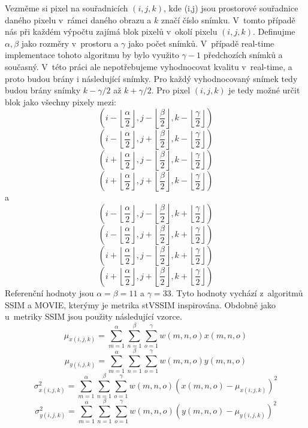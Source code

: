 \documentclass[thesis=M,czech]{FITthesis}[2016/06/26]
\begin{document}
Vezměme si pixel na souřadnicích $(i,j,k)$, kde (i,j) jsou prostorové souřadnice daného pixelu v~rámci daného obrazu a $k$ značí číslo snímku. V~tomto případě nás při každém výpočtu zajímá blok pixelů v~okolí pixelu $(i,j,k)$. Definujme $\alpha, \beta$ jako rozměry v~prostoru a $\gamma$ jako počet snímků. V~případě real-time implementace tohoto algoritmu by bylo využito $\gamma -1$ předchozích snímků a současný. V~této práci ale nepotřebujeme vyhodnocovat kvalitu v~real-time, a proto budou brány i následující snímky. Pro každý vyhodnocovaný snímek tedy budou brány snímky $k-\gamma/2$ až $k+\gamma/2$. Pro pixel $(i,j,k)$ je tedy možné určit blok jako všechny pixely mezi:
$$(i-\left \lfloor{\frac{\alpha}{2}}\right \rfloor,j-\left \lfloor{\frac{\beta}{2}}\right \rfloor,k-\left \lfloor{\frac{\gamma}{2}}\right \rfloor)$$
$$(i-\left \lfloor{\frac{\alpha}{2}}\right \rfloor,j+\left \lfloor{\frac{\beta}{2}}\right \rfloor,k-\left \lfloor{\frac{\gamma}{2}}\right \rfloor)$$
$$(i+\left \lfloor{\frac{\alpha}{2}}\right \rfloor,j-\left \lfloor{\frac{\beta}{2}}\right \rfloor,k-\left \lfloor{\frac{\gamma}{2}}\right \rfloor)$$
$$(i+\left \lfloor{\frac{\alpha}{2}}\right \rfloor,j+\left \lfloor{\frac{\beta}{2}}\right \rfloor,k-\left \lfloor{\frac{\gamma}{2}}\right \rfloor)$$
a
$$(i-\left \lfloor{\frac{\alpha}{2}}\right \rfloor,j-\left \lfloor{\frac{\beta}{2}}\right \rfloor,k+\left \lfloor{\frac{\gamma}{2}}\right \rfloor)$$
$$(i-\left \lfloor{\frac{\alpha}{2}}\right \rfloor,j+\left \lfloor{\frac{\beta}{2}}\right \rfloor,k+\left \lfloor{\frac{\gamma}{2}}\right \rfloor)$$
$$(i+\left \lfloor{\frac{\alpha}{2}}\right \rfloor,j-\left \lfloor{\frac{\beta}{2}}\right \rfloor,k+\left \lfloor{\frac{\gamma}{2}}\right \rfloor)$$
$$(i+\left \lfloor{\frac{\alpha}{2}}\right \rfloor,j+\left \lfloor{\frac{\beta}{2}}\right \rfloor,k+\left \lfloor{\frac{\gamma}{2}}\right \rfloor)$$
Referenční hodnoty jsou $\alpha=\beta=11$ a $\gamma=33$. Tyto hodnoty vychází z~algoritmů SSIM a MOVIE, kterýmy je metrika stVSSIM inspirována. Obdobně jako u~metriky SSIM jsou použity následující vzorce.
\begin{equation} 
\mu_{x(i,j,k)} = \sum_{m=1}^{\alpha}\sum_{n=1}^{\beta}\sum_{o=1}^{\gamma}w(m,n,o)x(m,n,o)
\end{equation}
\begin{equation} 
\mu_{y(i,j,k)} = \sum_{m=1}^{\alpha}\sum_{n=1}^{\beta}\sum_{o=1}^{\gamma}w(m,n,o)y(m,n,o)
\end{equation}
\begin{equation} 
\sigma_{x(i,j,k)}^2 = \sum_{m=1}^{\alpha}\sum_{n=1}^{\beta}\sum_{o=1}^{\gamma}w(m,n,o)(x(m,n,o)-\mu_{x(i,j,k)})^2
\end{equation}
\begin{equation} 
\sigma_{y(i,j,k)}^2 = \sum_{m=1}^{\alpha}\sum_{n=1}^{\beta}\sum_{o=1}^{\gamma}w(m,n,o)(y(m,n,o)-\mu_{y(i,j,k)})^2
\end{equation}
\end{document}
